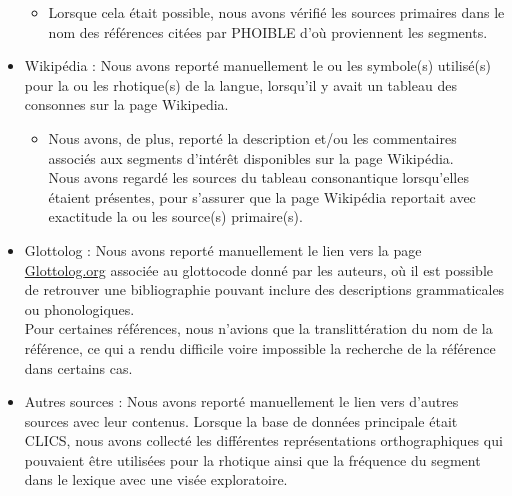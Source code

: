 \begin{itemize}
	\begin{itemize}
		\item Lorsque cela était possible, nous avons vérifié les sources primaires dans le nom des références citées par PHOIBLE d'où proviennent les segments.
	\end{itemize}
	\item Wikipédia : Nous avons reporté manuellement le ou les symbole(s) utilisé(s) pour la ou les rhotique(s) de la langue, lorsqu'il y avait un tableau des consonnes sur la page Wikipedia.
	\begin{itemize}
		\item Nous avons, de plus, reporté la description et/ou les commentaires associés aux segments d'intérêt disponibles sur la page Wikipédia.\\
		Nous avons regardé les sources du tableau consonantique lorsqu'elles étaient présentes, pour s'assurer que la page Wikipédia reportait avec exactitude la ou les source(s) primaire(s).
	\end{itemize}
	\item Glottolog : Nous avons reporté manuellement le lien vers la page \href{https://glottolog.org/}{Glottolog.org} associée au glottocode donné par les auteurs, où il est possible de retrouver une bibliographie pouvant inclure des descriptions grammaticales ou phonologiques.\\
	Pour certaines références, nous n'avions que la translittération du nom de la référence, ce qui a rendu difficile voire impossible la recherche de la référence dans certains cas.
	\item Autres sources : Nous avons reporté manuellement le lien vers d'autres sources avec leur contenus. Lorsque la base de données principale était CLICS, nous avons collecté les différentes représentations orthographiques qui pouvaient être utilisées pour la rhotique ainsi que la fréquence du segment dans le lexique avec une visée exploratoire.
\end{itemize}


